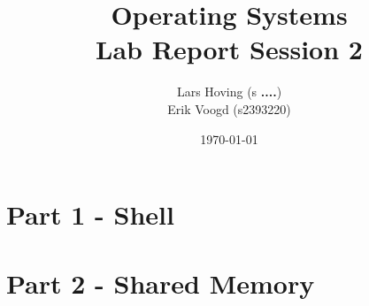 \documentclass[a4paper,14pt,twoside]{article}
\begin{document}
\title{Operating Systems \\ Lab Report Session 2
}
\date{\today}
\author{Lars Hoving (s \textbf{....})\\
Erik Voogd (s2393220)
}

\maketitle

\section{Part 1 - Shell}
\section{Part 2 - Shared Memory}
\end{document}
